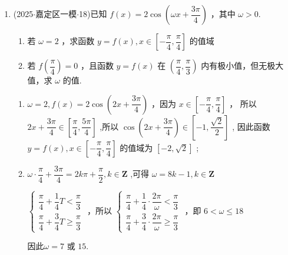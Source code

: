 \begin{enumerate}
\begin{jieda}
\begin{enumerate}
            \item 由 $f\left( \dfrac{B - \varphi }{2}\right)  = \dfrac{\sqrt{3}}{4}c$ ，得 $\sin B = \dfrac{\sqrt{3}}{4}c$ ，又 $a = 2$ ， $A = \dfrac{\pi }{6}$ ，则 $\sin B = \dfrac{b\sin A}{a} = \dfrac{b}{4} = \dfrac{\sqrt{3}}{4}c$ ,即 $b = \sqrt{3}c$ ,由余弦定理,得 ${a}^{2} = {b}^{2} +  {c}^{2} - {2bc}\cos A = 3{c}^{2} + {c}^{2} - 2\sqrt{3}c \cdot  c \cdot  \dfrac{\sqrt{3}}{2}$ ,解得 $c = 2$ ,则 $b =  2\sqrt{3}$.
        \end{enumerate}
    \end{jieda}
    \item (2025$\cdot$嘉定区一模$\cdot$18)已知 $f\left( x\right)  = 2\cos \left( {{\omega x} + \dfrac{3\pi }{4}}\right)$ ，其中 $\omega  > 0$.
    \begin{enumerate}
        \item 若 $\omega  = 2$ ，求函数 $y = f\left( x\right) ,x \in  \left\lbrack  {-\dfrac{\pi }{4},\dfrac{\pi }{4}}\right\rbrack$ 的值域
        \item 若 $f\left( \dfrac{\pi }{4}\right)  = 0$ ，且函数 $y = f\left( x\right)$ 在 $\left( {\dfrac{\pi }{4},\dfrac{\pi }{3}}\right)$ 内有极小值，但无极大值，求 $\omega$ 的值.
    \end{enumerate}
    \begin{jieda}
        \begin{enumerate}
            \item $\omega  = 2,f\left( x\right)  = 2\cos \left( {{2x} + \dfrac{3\pi }{4}}\right)$ ，因为 $x \in  \left\lbrack  {-\dfrac{\pi }{4},\dfrac{\pi }{4}}\right\rbrack$ ， 所以 ${2x} + \dfrac{3\pi }{4} \in  \left\lbrack  {\dfrac{\pi }{4},\dfrac{5\pi }{4}}\right\rbrack$ ,所以 $\cos \left( {{2x} + \dfrac{3\pi }{4}}\right)  \in  \left\lbrack  {-1,\dfrac{\sqrt{2}}{2}}\right\rbrack$ , 因此函数 $y = f\left( x\right) ,x \in  \left\lbrack  {-\dfrac{\pi }{4},\dfrac{\pi }{4}}\right\rbrack$ 的值域为 $\left\lbrack  {-2,\sqrt{2}}\right\rbrack$ ;
            
            \item $\omega \cdot \dfrac{\pi }{4} + \dfrac{3\pi }{4} = {2k\pi } + \dfrac{\pi }{2},k \in  \mathbf{Z}$ ,可得 $\omega  = {8k} - 1,k \in  \mathbf{Z}$
            
            $\left\{  \begin{array}{l} \dfrac{\pi }{4} + \dfrac{1}{4}T < \dfrac{\pi }{3} \\  \dfrac{\pi }{4} + \dfrac{3}{4}T \geq  \dfrac{\pi }{3} \end{array}\right.$ ，所以 $\left\{  \begin{array}{l} \dfrac{\pi }{4} + \dfrac{1}{4} \cdot  \dfrac{2\pi }{\omega } < \dfrac{\pi }{3} \\  \dfrac{\pi }{4} + \dfrac{3}{4} \cdot  \dfrac{2\pi }{\omega } \geq  \dfrac{\pi }{3} \end{array}\right.$ ，即 $6 < \omega  \leq  {18}$  
            
            因此$\omega  = 7$ 或 $15$.
        \end{enumerate}
    \end{jieda}
\end{enumerate}

